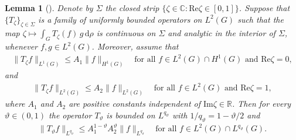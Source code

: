 \documentclass[a4paper,12pt]{amsart}
\numberwithin{equation}{section}
\newtheorem{lemma}[theorem]{Lemma}
\theoremstyle{definition}
\theoremstyle{remark}
\numberwithin{theorem}{section}
\newcommand{\R}{\mathbb{R}}
\renewcommand{\Re}{\mathrm{Re}}
\renewcommand{\Im}{\mathrm{Im}}
\renewcommand{\d}{\mathrm{d}}
\begin{document}
\begin{lemma}[{\cite[Theorem 5.3]{LiVaYa}}]\label{lem2.7}
Denote by $\Sigma$ the closed strip $\{\zeta\in\mathbb{C}:\Re \zeta\in[0,1]\}$. Suppose that $\{T_\zeta\}_{\zeta\in\Sigma}$ is a family of uniformly bounded operators on $L^2(G)$ such that the map $\zeta\mapsto \int_G T_\zeta(f)\, g\,\d \rho$ is continuous on $\Sigma$ and analytic in the interior of $\Sigma$, whenever $f,g\in L^2(G)$. Moreover, assume that
\begin{align*}
\|T_\zeta f\|_{L^1(G)}\leq A_1\|f\|_{H^1(G)}\quad\mbox{for all }f\in L^2(G)\cap H^1(G) \mbox{ and }\Re\zeta=0,
\end{align*}
and
\begin{align*}
\|T_\zeta f\|_{L^2(G)}\leq A_2\|f\|_{L^2(G)}\quad\mbox{for all }f\in L^2(G)\mbox{ and }\Re\zeta=1,
\end{align*}
where $A_1$ and $A_2$ are positive constants independent of $\Im \zeta\in\R$. Then for every $\vartheta\in(0,1)$ the operator $T_\vartheta$ is bounded on $L^{q_\vartheta}$ with $1/q_\vartheta=1-\vartheta/2$ and
\begin{align*}
\|T_\vartheta f\|_{L^{q_\vartheta}}\leq A_1^{1-\vartheta} A_2^\vartheta\|f\|_{L^{q_\vartheta}}\quad\mbox{for all }f\in L^2(G)\cap L^{q_\vartheta}(G).
\end{align*}
\end{lemma}
\end{document}
